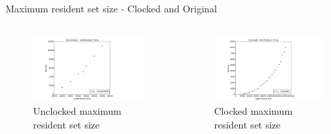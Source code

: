 \documentclass[11pt]{beamer}
\begin{document}
\begin{frame}{Maximum resident set size - Clocked and Original}
         \begin{columns}[t, totalwidth=1.02\textwidth]
             \begin{column}{0.50\linewidth}
\begin{figure}[!ht]
     \centering
     \includegraphics[scale=0.28]{figures/unclocked_verification_time.png}
     \caption{Unclocked maximum resident set size}
\end{figure}
             \end{column}

             \begin{column}{0.50\linewidth}
\begin{figure}[!ht]
     \centering
     \includegraphics[scale=0.28]{figures/clocked_verification_time.png}
     \caption{Clocked maximum resident set size}
\end{figure}
             \end{column}

         \end{columns}
\end{frame}
\end{document}
